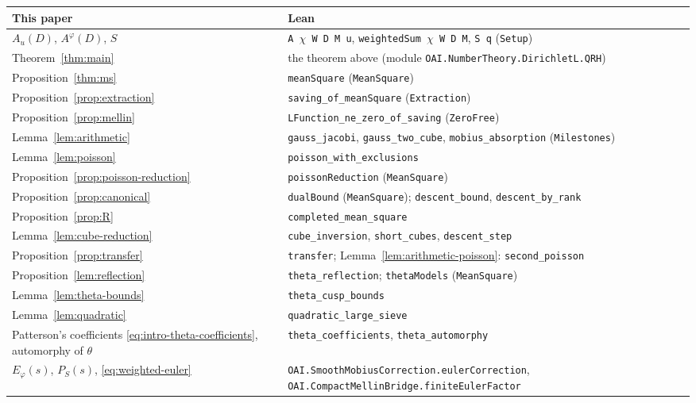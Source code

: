 \medskip
{\small\raggedright
\begin{tabular}{@{}p{}p{}@{}}
\toprule
This paper & Lean\\
\midrule
$A_u(D)$, $A^\varphi(D)$, $S$ & \texttt{A }$\chi$\texttt{ W D M u}, \texttt{weightedSum }$\chi$\texttt{ W D M}, \texttt{S q} (\texttt{Setup})\\
Theorem~\ref{thm:main} & the theorem above (module \texttt{OAI.NumberTheory.\allowbreak DirichletL.\allowbreak QRH})\\
Proposition~\ref{thm:ms} & \texttt{meanSquare} (\texttt{MeanSquare})\\
Proposition~\ref{prop:extraction} & \texttt{saving\_of\_meanSquare} (\texttt{Extraction})\\
Proposition~\ref{prop:mellin} & \texttt{LFunction\_ne\_zero\_of\_saving} (\texttt{ZeroFree})\\
Lemma~\ref{lem:arithmetic} & \texttt{gauss\_jacobi}, \texttt{gauss\_two\_cube}, \texttt{mobius\_absorption} (\texttt{Milestones})\\
Lemma~\ref{lem:poisson} & \texttt{poisson\_with\_exclusions}\\
Proposition~\ref{prop:poisson-reduction} & \texttt{poissonReduction} (\texttt{MeanSquare})\\
Proposition~\ref{prop:canonical} & \texttt{dualBound} (\texttt{MeanSquare}); \texttt{descent\_bound}, \texttt{descent\_by\_rank}\\
Proposition~\ref{prop:R} & \texttt{completed\_mean\_square}\\
Lemma~\ref{lem:cube-reduction} & \texttt{cube\_inversion}, \texttt{short\_cubes}, \texttt{descent\_step}\\
Proposition~\ref{prop:transfer} & \texttt{transfer}; Lemma~\ref{lem:arithmetic-poisson}: \texttt{second\_poisson}\\
Proposition~\ref{lem:reflection} & \texttt{theta\_reflection}; \texttt{thetaModels} (\texttt{MeanSquare})\\
Lemma~\ref{lem:theta-bounds} & \texttt{theta\_cusp\_bounds}\\
Lemma~\ref{lem:quadratic} & \texttt{quadratic\_large\_sieve}\\
Patterson's coefficients \eqref{eq:intro-theta-coefficients}, automorphy of $\theta$ & \texttt{theta\_coefficients}, \texttt{theta\_automorphy}\\
$E_\varphi(s)$, $P_S(s)$, \eqref{eq:weighted-euler} & \texttt{OAI.SmoothMobiusCorrection.\allowbreak eulerCorrection}, \texttt{OAI.CompactMellinBridge.\allowbreak finiteEulerFactor}\\
\bottomrule
\end{tabular}\par}

